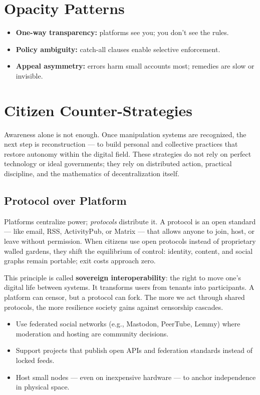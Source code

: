 \documentclass[12pt,twoside]{book}
\begin{document}
\section{Opacity Patterns}
\begin{itemize}
  \item \textbf{One-way transparency:} platforms see you; you don’t see the rules.
  \item \textbf{Policy ambiguity:} catch-all clauses enable selective enforcement.
  \item \textbf{Appeal asymmetry:} errors harm small accounts most; remedies are slow or invisible.
\end{itemize}

\section{Citizen Counter-Strategies}

Awareness alone is not enough.  
Once manipulation systems are recognized, the next step is reconstruction --- to build personal and collective practices that restore autonomy within the digital field.  
These strategies do not rely on perfect technology or ideal governments; they rely on distributed action, practical discipline, and the mathematics of decentralization itself.

\subsection*{Protocol over Platform}

Platforms centralize power; \emph{protocols} distribute it.  
A protocol is an open standard --- like email, RSS, ActivityPub, or Matrix --- that allows anyone to join, host, or leave without permission.  
When citizens use open protocols instead of proprietary walled gardens, they shift the equilibrium of control:  
identity, content, and social graphs remain portable; exit costs approach zero.

This principle is called \textbf{sovereign interoperability}: the right to move one’s digital life between systems.  
It transforms users from tenants into participants.  
A platform can censor, but a protocol can fork.  
The more we act through shared protocols, the more resilience society gains against censorship cascades.

\begin{itemize}
  \item Use federated social networks (e.g., Mastodon, PeerTube, Lemmy) where moderation and hosting are community decisions.  
  \item Support projects that publish open APIs and federation standards instead of locked feeds.  
  \item Host small nodes --- even on inexpensive hardware --- to anchor independence in physical space.
\end{itemize}
\end{document}
